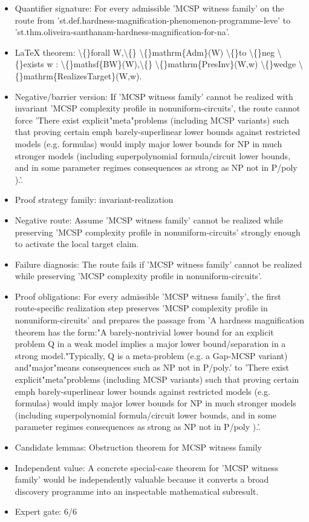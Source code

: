 \documentclass[11pt]{article}
\begin{document}
\begin{itemize}
\item Quantifier signature: For every admissible 'MCSP witness family' on the route from 'st.def.hardness-magnification-phenomenon-programme-leve' to 'st.thm.oliveira-santhanam-hardness-magnification-for-na'.
\item LaTeX theorem: \textbackslash\{\}forall W,\textbackslash\{\} \textbackslash\{\}mathrm\{Adm\}(W) \textbackslash\{\}to \textbackslash\{\}neg \textbackslash\{\}exists w : \textbackslash\{\}mathsf\{BW\}(W),\textbackslash\{\} \textbackslash\{\}mathrm\{PresInv\}(W,w) \textbackslash\{\}wedge \textbackslash\{\}mathrm\{RealizesTarget\}(W,w).
\item Negative/barrier version: If 'MCSP witness family' cannot be realized with invariant 'MCSP complexity profile in nonuniform-circuits', the route cannot force 'There exist explicit"meta"problems (including MCSP variants) such that proving certain emph barely-superlinear lower bounds against restricted models (e.g. formulas) would imply major lower bounds for NP in much stronger models (including superpolynomial formula/circuit lower bounds, and in some parameter regimes consequences as strong as NP not in P/poly ).'.
\item Proof strategy family: invariant-realization
\item Negative route: Assume 'MCSP witness family' cannot be realized while preserving 'MCSP complexity profile in nonuniform-circuits' strongly enough to activate the local target claim.
\item Failure diagnosis: The route fails if 'MCSP witness family' cannot be realized while preserving 'MCSP complexity profile in nonuniform-circuits'.
\item Proof obligations: For every admissible 'MCSP witness family', the first route-specific realization step preserves 'MCSP complexity profile in nonuniform-circuits' and prepares the passage from 'A hardness magnification theorem has the form:"A barely-nontrivial lower bound for an explicit problem Q in a weak model implies a major lower bound/separation in a strong model."Typically, Q is a meta-problem (e.g. a Gap-MCSP variant) and"major"means consequences such as NP not in P/poly.' to 'There exist explicit"meta"problems (including MCSP variants) such that proving certain emph barely-superlinear lower bounds against restricted models (e.g. formulas) would imply major lower bounds for NP in much stronger models (including superpolynomial formula/circuit lower bounds, and in some parameter regimes consequences as strong as NP not in P/poly ).'.
\item Candidate lemmas: Obstruction theorem for MCSP witness family
\item Independent value: A concrete special-case theorem for 'MCSP witness family' would be independently valuable because it converts a broad discovery programme into an inspectable mathematical subresult.
\item Expert gate: 6/6
\end{itemize}
\end{document}
